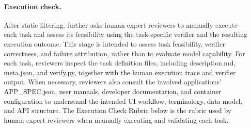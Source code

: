 \paragraph{Execution check.}
After static filtering, \datasetname further asks human expert reviewers to manually execute each task and assess its feasibility using the task-specific verifier and the resulting execution outcome. This stage is intended to assess task feasibility, verifier correctness, and failure attribution, rather than to evaluate model capability. For each task, reviewers inspect the task definition files, including {\ttfamily description.md}, {\ttfamily meta.json}, and {\ttfamily verify.py}, together with the human execution trace and verifier output. When necessary, reviewers also consult the involved applications' {\ttfamily APP\_SPEC.json}, user manuals, developer documentation, and container configuration to understand the intended UI workflow, terminology, data model, and API structure. The Execution Check Rubric below is the rubric used by human expert reviewers when manually executing and validating each task.

